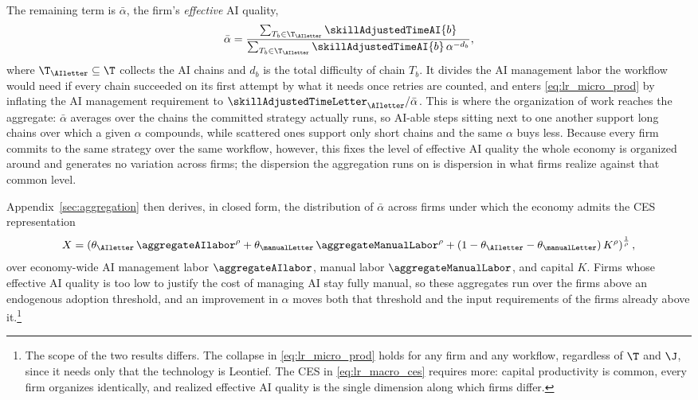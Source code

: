 The remaining term is $\bar{\alpha}$, the firm's \emph{effective} AI quality,
\begin{align}
\label{eq:lr_alphabar}
\bar{\alpha} = \frac{\sum_{T_b \in \T_{\AIletter}}\skillAdjustedTimeAI{b}}{\sum_{T_b \in \T_{\AIletter}}\skillAdjustedTimeAI{b}\,\alpha^{-d_{b}}},
\end{align}
where $\T_{\AIletter} \subseteq \T$ collects the AI chains and $d_b$ is the total difficulty of chain $T_b$.
It divides the AI management labor the workflow would need if every chain succeeded on its first attempt by what it needs once retries are counted, and enters \eqref{eq:lr_micro_prod} by inflating the AI management requirement to $\skillAdjustedTimeLetter_{\AIletter}/\bar{\alpha}$.
This is where the organization of work reaches the aggregate: $\bar{\alpha}$ averages over the chains the committed strategy actually runs, so AI-able steps sitting next to one another support long chains over which a given $\alpha$ compounds, while scattered ones support only short chains and the same $\alpha$ buys less.
Because every firm commits to the same strategy over the same workflow, however, this fixes the level of effective AI quality the whole economy is organized around and generates no variation across firms; the dispersion the aggregation runs on is dispersion in what firms realize against that common level.

Appendix~\ref{sec:aggregation} then derives, in closed form, the distribution of $\bar{\alpha}$ across firms under which the economy admits the CES representation
\begin{align}
\label{eq:lr_macro_ces}
X = \left(\theta_{\AIletter}\,\aggregateAIlabor^{\rho} + \theta_{\manualLetter}\,\aggregateManualLabor^{\rho} + (1-\theta_{\AIletter}-\theta_{\manualLetter})\,K^{\rho}\right)^{\frac{1}{\rho}},
\end{align}
over economy-wide AI management labor $\aggregateAIlabor$, manual labor $\aggregateManualLabor$, and capital $K$.
Firms whose effective AI quality is too low to justify the cost of managing AI stay fully manual, so these aggregates run over the firms above an endogenous adoption threshold, and an improvement in $\alpha$ moves both that threshold and the input requirements of the firms already above it.\footnote{The scope of the two results differs.
The collapse in \eqref{eq:lr_micro_prod} holds for any firm and any workflow, regardless of $\T$ and $\J$, since it needs only that the technology is Leontief.
The CES in \eqref{eq:lr_macro_ces} requires more: capital productivity is common, every firm organizes identically, and realized effective AI quality is the single dimension along which firms differ.}

